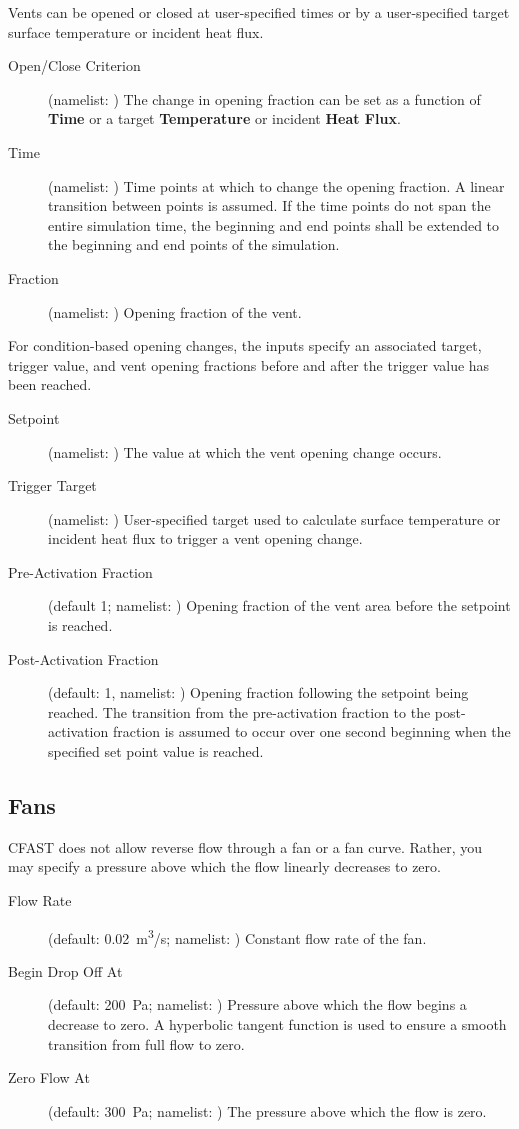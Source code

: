 {{Vents can be opened or closed at user-specified times or by a user-specified target surface temperature or incident heat flux.
\begin{description}
\item[Open/Close Criterion] (namelist: ) The change in opening fraction can be set as a function of \textbf{Time} or a target \textbf{Temperature} or incident \textbf{Heat Flux}.
\item[Time] (namelist: ) Time points at which to change the opening fraction. A linear transition between points is assumed. If the time points do not span the entire simulation time, the beginning and end points shall be extended to the beginning and end points of the simulation.
\item[Fraction] (namelist: ) Opening fraction of the vent.
\end{description}
For condition-based opening changes, the inputs specify an associated target, trigger value, and vent opening fractions before and after the trigger value has been reached.
\begin{description}
\item[Setpoint] (namelist: ) The value at which the vent opening change occurs.
\item[Trigger Target] (namelist: ) User-specified target used to calculate surface temperature or incident heat flux to trigger a vent opening change.
\item[Pre-Activation Fraction] (default 1; namelist: ) Opening fraction of the vent area before the setpoint is reached.
\item[Post-Activation Fraction] (default: 1, namelist: ) Opening fraction following the setpoint being reached. The transition from the pre-activation fraction to the post-activation fraction is assumed to occur over one second beginning when the specified set point value is reached.
\end{description}


\subsection{Fans}
\label{info:VENT4}

CFAST does not allow reverse flow through a fan or a fan curve. Rather, you may specify a pressure above which the flow linearly decreases to zero.
\begin{description}
\item[Flow Rate] (default: 0.02~\unit{m^3/s}; namelist: ) Constant flow rate of the fan.
\item[Begin Drop Off At] (default: 200~Pa; namelist: ) Pressure above which the flow begins a decrease to zero. A hyperbolic tangent function is used to ensure a smooth transition from full flow to zero.
\item[Zero Flow At] (default: 300~Pa; namelist: ) The pressure above which the flow is zero.
\end{description}



}}
